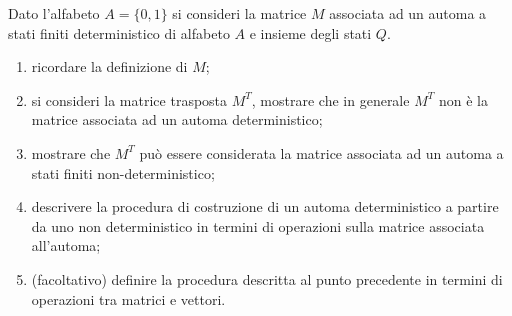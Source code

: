 
\begin{ex}
Dato l'alfabeto $A=\{0,1\}$ si consideri la matrice $M$ associata ad un automa a stati finiti deterministico di alfabeto $A$ e insieme degli stati $Q$.
\ 
\begin{enumerate}
    \item ricordare la definizione di $M$;
    \item si consideri la matrice trasposta $M^T$, mostrare che in generale $M^T$ non è la matrice associata ad un automa deterministico;
    \item mostrare che $M^T$ può essere considerata la matrice associata ad un automa a stati finiti non-deterministico;
    \item descrivere la procedura di costruzione di un automa deterministico a partire da uno non deterministico in termini di operazioni sulla matrice associata all'automa;
    \item (facoltativo) definire la procedura descritta al punto precedente in termini di operazioni tra matrici e vettori.
\end{enumerate}
\end{ex}

